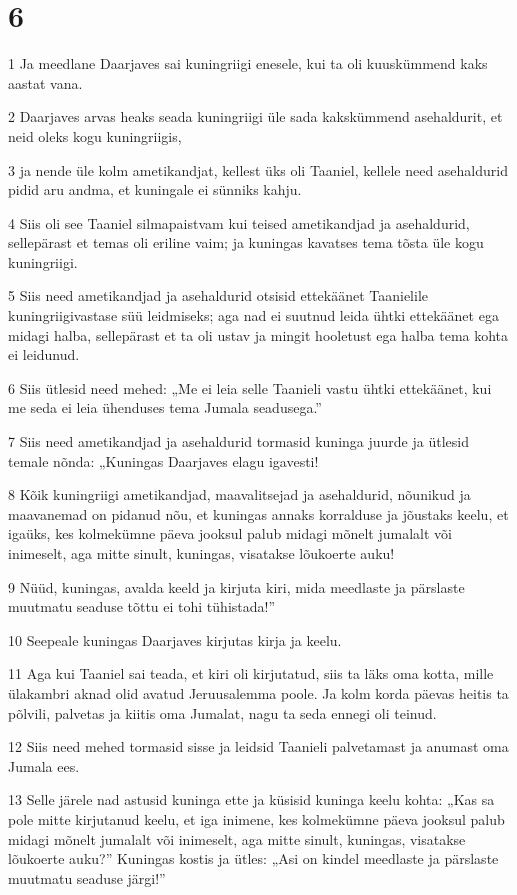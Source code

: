 \chapter{6}

\par 1 Ja meedlane Daarjaves sai kuningriigi enesele, kui ta oli kuuskümmend kaks aastat vana.
\par 2 Daarjaves arvas heaks seada kuningriigi üle sada kakskümmend asehaldurit, et neid oleks kogu kuningriigis,
\par 3 ja nende üle kolm ametikandjat, kellest üks oli Taaniel, kellele need asehaldurid pidid aru andma, et kuningale ei sünniks kahju.
\par 4 Siis oli see Taaniel silmapaistvam kui teised ametikandjad ja asehaldurid, sellepärast et temas oli eriline vaim; ja kuningas kavatses tema tõsta üle kogu kuningriigi.
\par 5 Siis need ametikandjad ja asehaldurid otsisid ettekäänet Taanielile kuningriigivastase süü leidmiseks; aga nad ei suutnud leida ühtki ettekäänet ega midagi halba, sellepärast et ta oli ustav ja mingit hooletust ega halba tema kohta ei leidunud.
\par 6 Siis ütlesid need mehed: „Me ei leia selle Taanieli vastu ühtki ettekäänet, kui me seda ei leia ühenduses tema Jumala seadusega.”
\par 7 Siis need ametikandjad ja asehaldurid tormasid kuninga juurde ja ütlesid temale nõnda: „Kuningas Daarjaves elagu igavesti!
\par 8 Kõik kuningriigi ametikandjad, maavalitsejad ja asehaldurid, nõunikud ja maavanemad on pidanud nõu, et kuningas annaks korralduse ja jõustaks keelu, et igaüks, kes kolmekümne päeva jooksul palub midagi mõnelt jumalalt või inimeselt, aga mitte sinult, kuningas, visatakse lõukoerte auku!
\par 9 Nüüd, kuningas, avalda keeld ja kirjuta kiri, mida meedlaste ja pärslaste muutmatu seaduse tõttu ei tohi tühistada!”
\par 10 Seepeale kuningas Daarjaves kirjutas kirja ja keelu.
\par 11 Aga kui Taaniel sai teada, et kiri oli kirjutatud, siis ta läks oma kotta, mille ülakambri aknad olid avatud Jeruusalemma poole. Ja kolm korda päevas heitis ta põlvili, palvetas ja kiitis oma Jumalat, nagu ta seda ennegi oli teinud.
\par 12 Siis need mehed tormasid sisse ja leidsid Taanieli palvetamast ja anumast oma Jumala ees.
\par 13 Selle järele nad astusid kuninga ette ja küsisid kuninga keelu kohta: „Kas sa pole mitte kirjutanud keelu, et iga inimene, kes kolmekümne päeva jooksul palub midagi mõnelt jumalalt või inimeselt, aga mitte sinult, kuningas, visatakse lõukoerte auku?” Kuningas kostis ja ütles: „Asi on kindel meedlaste ja pärslaste muutmatu seaduse järgi!”
